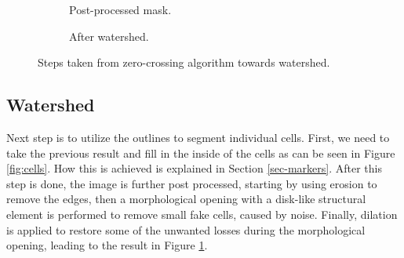 \documentclass[
  digital,     %
  oneside,     %
  nosansbold,  %
  nocolorbold, %
  lof,         %
  lot,         %
]{fithesis4}
\begin{document}
\begin{figure}
\begin{subfigure}[t]{0.45\textwidth}
        \caption{Post-processed mask.}
        \label{fig:cells-post-processed}
    \end{subfigure}
    \begin{subfigure}[t]{0.45\textwidth}
        \caption{After watershed.}
        \label{fig:watershed}
    \end{subfigure}
    \caption{Steps taken from zero-crossing algorithm towards watershed.}
    \label{fig:zc-watershed}
\end{figure}

\subsection*{Watershed}
Next step is to utilize the outlines to segment individual cells. First, we need
to take the previous result and fill in the inside of the cells as can be seen
in Figure \ref{fig:cells}. How this is achieved is explained in Section
\ref{sec-markers}. After this step is done, the image is further post processed,
starting by using erosion to remove the edges, then a morphological opening with
a disk-like structural element is performed to remove small fake cells, caused
by noise. Finally, dilation is applied to restore some of the unwanted losses
during the morphological opening, leading to the result in Figure 
\ref{fig:cells-post-processed}.
\end{document}
